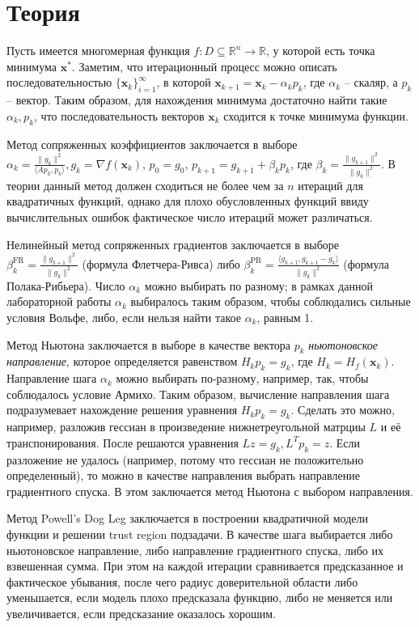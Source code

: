 \documentclass[12pt]{article}
\begin{document}
\section{Теория}

Пусть имеется многомерная функция $f : D \subseteq \mathbb{R}^n \rightarrow \mathbb{R}$, у которой есть точка минимума $\textbf{x}^*$. Заметим, что итерационный процесс можно описать последовательностью $\{\textbf{x}_k\}_{i=1}^{\infty}$, в которой $\textbf{x}_{k+1} = \textbf{x}_k - \alpha_k p_k$, где $\alpha_k$ -- скаляр, а $p_k$ -- вектор. Таким образом, для нахождения минимума достаточно найти такие $\alpha_k, p_k$, что последовательность векторов $\textbf{x}_k$ сходится к точке минимума функции.

Метод сопряженных коэффициентов заключается в выборе $\alpha_k = \frac{\|g_k \|^2}{\langle Ap_k,p_k\rangle}, g_k = \nabla f(\textbf{x}_k)$, $p_0 = g_0$, $p_{k+1} = g_{k+1} + \beta_k p_k$, где $\beta_k = \frac{\|g_{k+1} \|^2}{\|g_k \|^2}$. В теории данный метод должен сходиться не более чем за $n$ итераций для квадратичных функций, однако для плохо обусловленных функций ввиду вычислительных ошибок фактическое число итераций может различаться.

Нелинейный метод сопряженных градиентов заключается в выборе $\beta_k^{\text{FR}} = \frac{\|g_{k+1} \|^2}{\|g_k \|^2}$ (формула Флетчера-Ривса) либо $\beta_k^{\text{PR}} = \frac{\langle g_{k+1}, g_{k+1} - g_k\rangle}{\|g_k \|^2}$ (формула Полака-Рибьера). Число $\alpha_k$ можно выбирать по разному; в рамках данной лабораторной работы $\alpha_k$ выбиралось таким образом, чтобы соблюдались сильные условия Вольфе, либо, если нельзя найти такое $\alpha_k$, равным 1.

Метод Ньютона заключается в выборе в качестве вектора $p_k$ \textit{ньютоновское направление}, которое определяется равенством $H_k p_k = g_k$, где $H_k = H_f(\textbf{x}_k)$. Направление шага $\alpha_k$ можно выбирать по-разному, например, так, чтобы соблюдалось условие Армихо. Таким образом, вычисление направления шага подразумевает нахождение решения уравнения $H_k p_k = g_k$. Сделать это можно, например, разложив гессиан в произведение нижнетреугольной матрциы $L$ и её транспонирования. После решаются уравнения $Lz = g_k, L^Tp_k = z$. Если разложение не удалось (например, потому что гессиан не положительно определенный), то можно в качестве направления выбрать направление градиентного спуска. В этом заключается метод Ньютона с выбором направления.

Метод Powell's Dog Leg заключается в построении квадратичной модели функции и решении trust region подзадачи. В качестве шага выбирается либо ньютоновское направление, либо направление градиентного спуска, либо их взвешенная сумма. При этом на каждой итерации сравнивается предсказанное и фактическое убывания, после чего радиус доверительной области либо уменьшается, если модель плохо предсказала функцию, либо не меняется или увеличивается, если предсказание оказалось хорошим.
\end{document}
